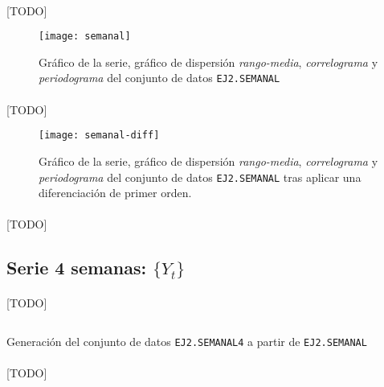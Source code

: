 \documentclass[a4paper, spanish]{article}
\begin{document}
      \paragraph{}
      [TODO]

      \begin{figure}[htb!]
        \centering
        \texttt{[image: semanal]}
        \caption{Gráfico de la serie, gráfico de dispersión \emph{rango-media}, \emph{correlograma} y \emph{periodograma} del conjunto de datos \texttt{EJ2.SEMANAL}}
        \label{img:semanal}
      \end{figure}

      \paragraph{}
      [TODO]

      \begin{figure}[htb!]
        \centering
        \texttt{[image: semanal-diff]}
        \caption{Gráfico de la serie, gráfico de dispersión \emph{rango-media}, \emph{correlograma} y \emph{periodograma} del conjunto de datos \texttt{EJ2.SEMANAL} tras aplicar una diferenciación de primer orden.}
        \label{img:semanal_diff}
      \end{figure}

      \paragraph{}
      [TODO]

    \subsection{Serie  4 semanas: $\{Y_t\}$}

      \paragraph{}
      [TODO]

      \begin{listing}[htb!]
        \centering
        \inputminted{SAS}{./res/code/a-02-expand.sas}
        \caption{Generación del conjunto de datos \texttt{EJ2.SEMANAL4} a partir de \texttt{EJ2.SEMANAL}}
        \label{code:a_expand}
      \end{listing}

      \paragraph{}
      [TODO]
\end{document}
